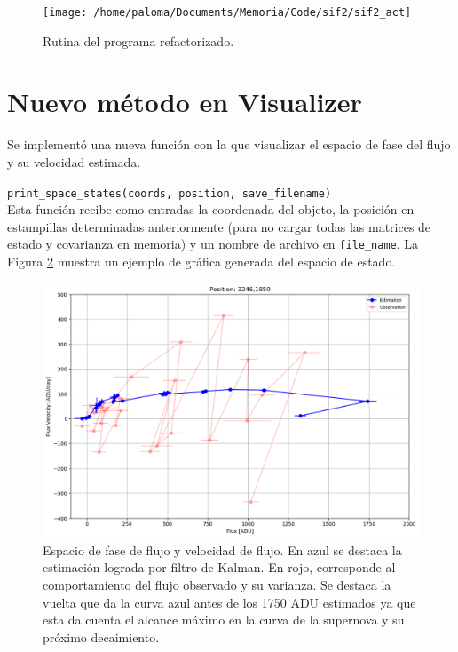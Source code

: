 \begin{figure}
\centering
\texttt{[image: /home/paloma/Documents/Memoria/Code/sif2/sif2\_act]}
\label{fig:new_routine}
\caption{Rutina del programa refactorizado.}
\end{figure}


\section{Nuevo m\'etodo en Visualizer}

Se implement\'o una nueva funci\'on con la que visualizar el espacio de fase del flujo y su velocidad estimada.

\texttt{print\_space\_states(coords, position, save\_filename)}\\

Esta funci\'on recibe como entradas la coordenada del objeto, la posici\'on en estampillas determinadas anteriormente (para no cargar todas las matrices de estado y covarianza en memoria) y un nombre de archivo en \texttt{file\_name}. La Figura \ref{fig:sp_st} muestra un ejemplo de gr\'afica generada del espacio de estado.  

\begin{figure}
\includegraphics[scale=.5]{images/space_curve.png}
\caption{Espacio de fase de flujo y velocidad de flujo. En azul se destaca la estimaci\'on lograda por filtro de Kalman. En rojo, corresponde al comportamiento del flujo observado y su varianza. Se destaca la vuelta que da la curva azul antes de los 1750 ADU estimados ya que esta da cuenta el alcance m\'aximo en la curva de la supernova y su pr\'oximo decaimiento.}
\label{fig:sp_st}
\end{figure}

